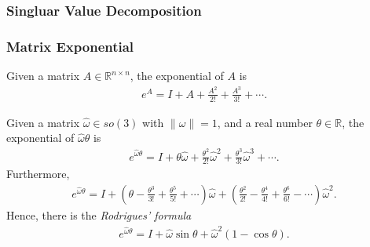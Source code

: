 \subsubsection{Singluar Value Decomposition}

\subsubsection{Matrix Exponential}
Given a matrix $A \in \mathbb{R}^{n \times n}$, the exponential of $A$ is
\begin{align}
e^A = I + A + \frac{A^2}{2!} + \frac{A^3}{3!} + \cdots .
\end{align}

Given a matrix $\hat \omega \in so(3)$ with $\| \omega \| =1$, and a real number $\theta \in \mathbb{R}$, the exponential of ${\hat \omega \theta} $ is
\begin{align}
e^{\hat \omega \theta} = I +  \theta {\hat \omega} + \frac{ \theta^2}{2!} {\hat \omega}^2 + \frac{\theta^3}{3!} {\hat \omega}^3 + \cdots .
\end{align}
Furthermore,
\begin{align}
e^{\hat \omega \theta} = I + (\theta -  \frac{\theta^3}{3!} +  \frac{\theta^5}{5!} + \cdots ) {\hat \omega} +
(\frac{\theta^2}{2!} -  \frac{\theta^4}{4!} + \frac{\theta^6}{6!} - \cdots ) {\hat \omega}^2.
\end{align}
Hence, there is the {\it  Rodrigues' formula \cite{murray1994}}
\begin{align}
e^{\hat \omega \theta} = I + {\hat \omega}\sin \theta + {\hat \omega}^2 (1- \cos \theta).
\end{align}





%
%
